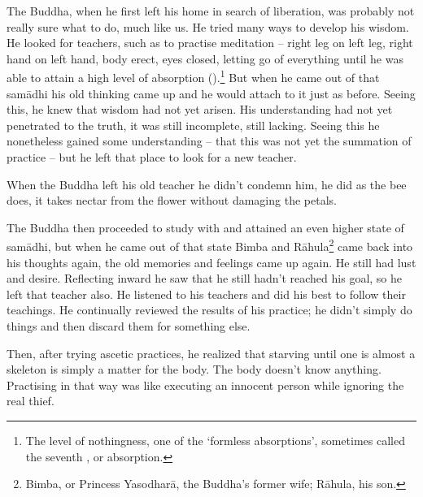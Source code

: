 The Buddha, when he first left his home in search of liberation, was probably not really sure what to do, much like us. He tried many ways to develop his wisdom. He looked for teachers, such as  to practise meditation -- right leg on left leg, right hand on left hand, body erect, eyes closed, letting go of everything until he was able to attain a high level of absorption ().\footnote{The level of nothingness, one of the `formless absorptions', sometimes called the seventh , or absorption.} But when he came out of that sam\=adhi his old thinking came up and he would attach to it just as before. Seeing this, he knew that wisdom had not yet arisen. His understanding had not yet penetrated to the truth, it was still incomplete, still lacking. Seeing this he nonetheless gained some understanding -- that this was not yet the summation of practice -- but he left that place to look for a new teacher. 

When the Buddha left his old teacher he didn't condemn him, he did as the bee does, it takes nectar from the flower without damaging the petals. 

The Buddha then proceeded to study with  and attained an even higher state of sam\=adhi, but when he came out of that state Bimba and R\=ahula\footnote{Bimba, or Princess Yasodhar\=a, the Buddha's former wife; R\=ahula, his son.} came back into his thoughts again, the old memories and feelings came up again. He still had lust and desire. Reflecting inward he saw that he still hadn't reached his goal, so he left that teacher also. He listened to his teachers and did his best to follow their teachings. He continually reviewed the results of his practice; he didn't simply do things and then discard them for something else. 

Then, after trying ascetic practices, he realized that starving until one is almost a skeleton is simply a matter for the body. The body doesn't know anything. Practising in that way was like executing an innocent person while ignoring the real thief. 

